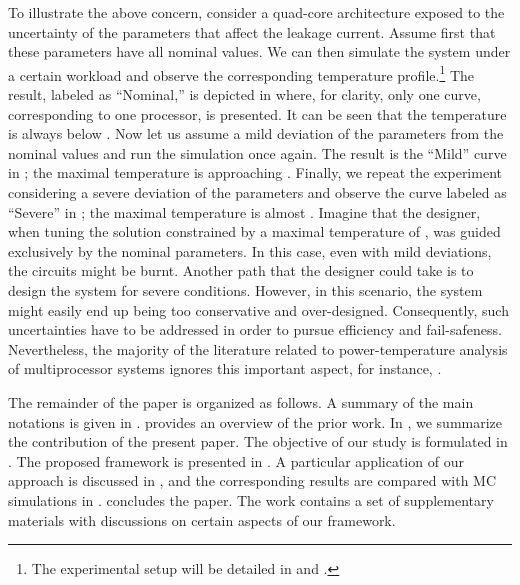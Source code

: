 To illustrate the above concern, consider a quad-core architecture exposed to
the uncertainty of the parameters that affect the leakage current. Assume first
that these parameters have all nominal values. We can then simulate the system
under a certain workload and observe the corresponding temperature
profile.\footnote{The experimental setup will be detailed in
 and .} The result,
labeled as ``Nominal,'' is depicted in  where, for
clarity, only one curve, corresponding to one processor, is presented. It can be
seen that the temperature is always below . Now let us assume a mild
deviation of the parameters from the nominal values and run the simulation once
again. The result is the ``Mild'' curve in ; the
maximal temperature is approaching . Finally, we repeat the
experiment considering a severe deviation of the parameters and observe the
curve labeled as ``Severe'' in ; the maximal
temperature is almost . Imagine that the designer, when tuning the
solution constrained by a maximal temperature of , was guided
exclusively by the nominal parameters. In this case, even with mild deviations,
the circuits might be burnt. Another path that the designer could take is to
design the system for severe conditions. However, in this scenario, the system
might easily end up being too conservative and over-designed. Consequently, such
uncertainties have to be addressed in order to pursue efficiency and
fail-safeness. Nevertheless, the majority of the literature related to
power-temperature analysis of multiprocessor systems ignores this important
aspect, for instance, \cite{rao2009, rai2011, thiele2011, ukhov2012}.

The remainder of the paper is organized as follows. A summary of the main
notations is given in .  provides an overview of
the prior work. In , we summarize the contribution of the
present paper. The objective of our study is formulated in
. The proposed framework is presented in
. A particular application of our approach is discussed
in , and the corresponding results are compared with
MC simulations in .  concludes the
paper. The work contains a set of supplementary materials with discussions on
certain aspects of our framework.

